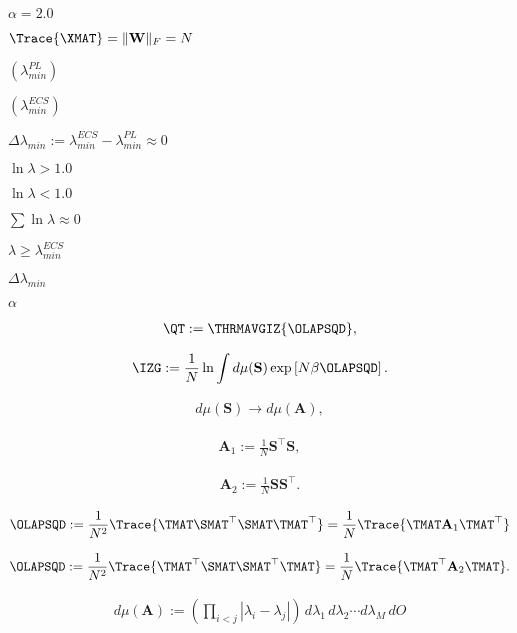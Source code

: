 $\alpha=2.0$

$\Trace{\XMAT}=\Vert\mathbf{W}\Vert_{F}=N$

$(\lambda_{min}^{PL})$

$(\lambda_{min}^{ECS})$

$\Delta \lambda_{min}:=\lambda_{min}^{ECS}-\lambda_{min}^{PL}\approx 0$

$\ln\lambda>1.0$

$\ln\lambda<1.0$

$\sum\ln\lambda\approx 0$

$\lambda\ge\lambda_{min}^{ECS}$

$\Delta \lambda_{min}$

$\alpha$

\begin{align}
  \label{eqn:QT_2}
  \QT:=\THRMAVGIZ{\OLAPSQD },
\end{align}

\begin{align}
  \label{eqn:betaIZG_S}
  \IZG:=  \frac{1}{N}\ln \int d\mu(\mathbf{S}) \exp\left[N\beta\OLAPSQD\right] .
\end{align}

\begin{align}
  \label{eqn:changeOfMeasure}
  d\mu(\mathbf{S})\rightarrow d\mu(\mathbf{A}) ,
\end{align}

\begin{align}
    \label{eqn:A1}
  \mathbf{A}_{1}:=\frac{1}{N}\mathbf{S}^{\top}\mathbf{S} ,
\end{align}

\begin{align}
  \label{eqn:A2}
  \mathbf{A}_{2}:=\frac{1}{N}\mathbf{S}\mathbf{S}^{\top} .
\end{align}

\begin{align}
  \label{eqn:TraceR2withA1}
  \OLAPSQD:=\frac{1}{N^{2}}\Trace{\TMAT\SMAT^{\top}\SMAT\TMAT^{\top}}
  =\frac{1}{N}\Trace{\TMAT\mathbf{A}_{1}\TMAT^{\top}}
\end{align}

\begin{align}
  \label{eqn:TraceR2withA2}
  \OLAPSQD:=\frac{1}{N^{2}}\Trace{\TMAT^{\top}\SMAT\SMAT^{\top}\TMAT}
  =\frac{1}{N}\Trace{\TMAT^{\top}\mathbf{A}_{2}\TMAT}  .
\end{align}

\begin{align}
  \label{eqn:dmuA}
   d\mu(\mathbf{A}) := \left( \prod_{i < j} |\lambda_i - \lambda_j| \right) \, d\lambda_1 \, d\lambda_2 \cdots d\lambda_M \, dO
\end{align}

